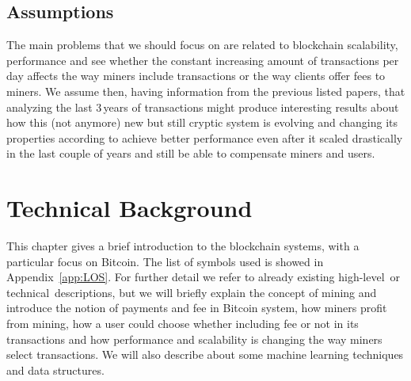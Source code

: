\documentclass[USenglish]{uit-thesis}
\begin{document}
\section{Assumptions} %
\label{sec:assumptions}
The main problems that we should focus on
are related to blockchain scalability, performance and
see whether the constant increasing amount of transactions
per day affects the way miners include transactions
or the way clients offer fees to miners.
We assume then, having information from the
previous listed papers, that analyzing the last $3$\,years
of transactions might produce interesting
results about how this (not anymore) new but still
cryptic system is evolving and changing its
properties according to achieve better performance
even after it scaled drastically in the last couple of
years
and still be able to compensate miners and users.

\chapter{Technical Background}
\label{chap:techback}
This chapter gives a brief introduction to
the blockchain systems, with a particular
focus on Bitcoin. The list of symbols
used is showed in Appendix~\ref{app:LOS}.
For further detail we refer
to already existing high-level\,\cite{Bohme2015BETG} or
technical\,\cite{ethereum, bitcoinmining,
bitcoin_blockchain, Rizun:2015:blocksizelimit, Nakamoto_bitcoin,
ethereum_white_paper} descriptions, but we will briefly explain
the concept of mining and introduce the notion
of payments and fee in Bitcoin system,
how miners profit from mining,
how a user could choose whether including fee or not in its
transactions and how performance and scalability is
changing the way miners select transactions.
We will also describe about some machine learning
techniques and data structures.
\end{document}
